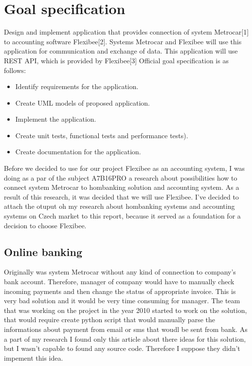 \documentclass[11pt,twoside,a4paper]{book}
\begin{document}
\section{Goal specification}
Design and implement application that provides connection of system Metrocar[1] to accounting software Flexibee[2]. Systems Metrocar and Flexibee will use this application for communication and exchange of data. This application will use REST API, which is provided by Flexibee[3]
Official goal specification is as follows:
\begin{itemize}
\item Identify requirements for the application.
\item Create UML models of proposed application.
\item Implement the application.
\item Create unit tests, functional tests and performance tests).
\item Create documentation for the application.
\end{itemize}

Before we decided to use for our project Flexibee as an accounting system, I was doing as a par of the subject 
A7B16PRO a research about possibilities how to connect system Metrocar to hombanking solution and accounting system.
As a result of this research, it was decided that we will use Flexibee. I've decided to attach the otuput oh my research about hombanking systems and accounting systems on Czech market to this report, because it served as a foundation for a decision to 
choose Flexibee. 

\subsection{Online banking}
Originally was system Metrocar without any kind of connection to company's bank account. Therefore, manager of company would 
have to manually check incoming payments and then change the status of appropriate invoice. This is very bad solution and it 
would be very time consuming for manager. The team that was working on the project in the year 2010 started to work on the solution, that would require create python script that would manually parse the informations about payment from email or sms that woudl be sent from bank\cite{reserse2010}. As a part of my research I found only this article about there ideas for this solution, but I wasn't capable to found any source code. Therefore I suppose they didn't impement this idea. 
\end{document}
